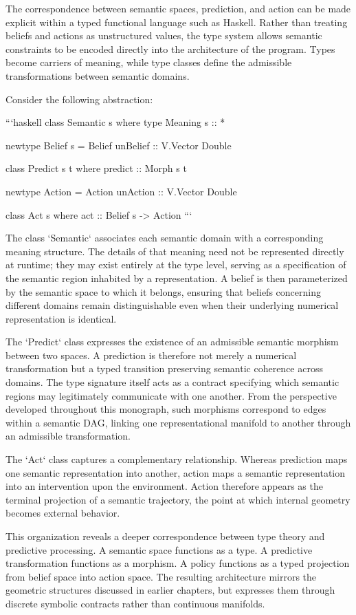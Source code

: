\documentclass[12pt,letterpaper]{article}
\theoremstyle{remark}
\begin{document}
The correspondence between semantic spaces, prediction, and action can be made explicit within a typed functional language such as Haskell. Rather than treating beliefs and actions as unstructured values, the type system allows semantic constraints to be encoded directly into the architecture of the program. Types become carriers of meaning, while type classes define the admissible transformations between semantic domains.

Consider the following abstraction:

```haskell
class Semantic s where
  type Meaning s :: *

newtype Belief s =
  Belief { unBelief :: V.Vector Double }

class Predict s t where
  predict :: Morph s t

newtype Action =
  Action { unAction :: V.Vector Double }

class Act s where
  act :: Belief s -> Action
```

The class `Semantic` associates each semantic domain with a corresponding meaning structure. The details of that meaning need not be represented directly at runtime; they may exist entirely at the type level, serving as a specification of the semantic region inhabited by a representation. A belief is then parameterized by the semantic space to which it belongs, ensuring that beliefs concerning different domains remain distinguishable even when their underlying numerical representation is identical.

The `Predict` class expresses the existence of an admissible semantic morphism between two spaces. A prediction is therefore not merely a numerical transformation but a typed transition preserving semantic coherence across domains. The type signature itself acts as a contract specifying which semantic regions may legitimately communicate with one another. From the perspective developed throughout this monograph, such morphisms correspond to edges within a semantic DAG, linking one representational manifold to another through an admissible transformation.

The `Act` class captures a complementary relationship. Whereas prediction maps one semantic representation into another, action maps a semantic representation into an intervention upon the environment. Action therefore appears as the terminal projection of a semantic trajectory, the point at which internal geometry becomes external behavior.

This organization reveals a deeper correspondence between type theory and predictive processing. A semantic space functions as a type. A predictive transformation functions as a morphism. A policy functions as a typed projection from belief space into action space. The resulting architecture mirrors the geometric structures discussed in earlier chapters, but expresses them through discrete symbolic contracts rather than continuous manifolds.
\end{document}
